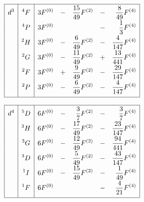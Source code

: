 \begin{table}
\begin{minipage}{0.5\textwidth}
\begin{equation*}
\renewcommand{\arraystretch}{1.8}
\begin{array}{|>{\displaystyle}c|>{\displaystyle}c|>{\displaystyle}r >{\displaystyle}c >{\displaystyle}r >{\displaystyle}c >{\displaystyle}r|}
\hline
d^3 & ^4F & 3 F^{(0)} & - & \frac{15}{49} F^{(2)} & - & \frac{8}{49} F^{(4)} \\
    & ^4P & 3 F^{(0)} &   &   & - & \frac{1}{3} F^{(4)} \\
    & ^2H & 3 F^{(0)} & - & \frac{6}{49} F^{(2)} & - & \frac{4}{147} F^{(4)} \\
    & ^2G & 3 F^{(0)} & - & \frac{11}{49} F^{(2)} & + & \frac{13}{441} F^{(4)} \\
    & ^2F & 3 F^{(0)} & + & \frac{9}{49} F^{(2)} & - & \frac{29}{147} F^{(4)} \\
    & ^2P & 3 F^{(0)} & - & \frac{6}{49} F^{(2)} & - & \frac{4}{147} F^{(4)} \\[0.5em]
\hline
\end{array}
\end{equation*}
\end{minipage}
\begin{minipage}{0.5\textwidth}
\begin{equation*}
\renewcommand{\arraystretch}{1.8}
\begin{array}{|>{\displaystyle}c|>{\displaystyle}c|>{\displaystyle}r >{\displaystyle}c >{\displaystyle}r >{\displaystyle}c >{\displaystyle}r|}
\hline
d^4 & ^5D & 6 F^{(0)} & - & \frac{3}{7} F^{(2)} & - & \frac{3}{7} F^{(4)} \\
    & ^3H & 6 F^{(0)} & - & \frac{17}{49} F^{(2)} & - & \frac{23}{147} F^{(4)} \\
    & ^3G & 6 F^{(0)} & - & \frac{12}{49} F^{(2)} & - & \frac{94}{441} F^{(4)} \\
    & ^3D & 6 F^{(0)} & - & \frac{5}{49} F^{(2)} & - & \frac{43}{147} F^{(4)} \\
    & ^1I & 6 F^{(0)} & - & \frac{15}{49} F^{(2)} & - & \frac{1}{49} F^{(4)} \\
    & ^1F & 6 F^{(0)} &   &   & - & \frac{4}{21} F^{(4)} \\[0.5em]
\hline
\end{array}
\end{equation*}
\end{minipage}
\end{table}
\clearpage

